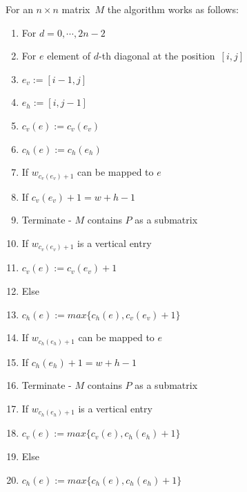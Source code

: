 For an $n\times n$ matrix~$M$ the algorithm works as follows:
\begin{enumerate}
\item For $d=0,\cdots,2n-2$
\item \hspace{5mm} For $e$ element of $d$-th diagonal at the position~$[i,j]$
\item \hspace{1cm} $e_v:=[i-1,j]$
\item \hspace{1cm} $e_h:=[i,j-1]$
\item \hspace{1cm} $c_v(e):=c_v(e_v)$
\item \hspace{1cm} $c_h(e):=c_h(e_h)$
\item \hspace{1cm} If $w_{c_v(e_v)+1}$ can be mapped to $e$
\item \hspace{15mm} If $c_v(e_v)+1=w+h-1$
\item \hspace{2cm} Terminate - $M$ contains $P$ as a submatrix
\item \hspace{15mm} If $w_{c_v(e_v)+1}$ is a vertical entry
\item \hspace{2cm} $c_v(e):=c_v(e_v)+1$
\item \hspace{15mm} Else
\item \hspace{2cm} $c_h(e):=max\{c_h(e),c_v(e_v)+1\}$
\item \hspace{1cm} If $w_{c_h(e_h)+1}$ can be mapped to $e$
\item \hspace{15mm} If $c_h(e_h)+1=w+h-1$
\item \hspace{2cm} Terminate - $M$ contains $P$ as a submatrix
\item \hspace{15mm} If $w_{c_h(e_h)+1}$ is a vertical entry
\item \hspace{2cm} $c_v(e):=max\{c_v(e),c_h(e_h)+1\}$
\item \hspace{15mm} Else
\item \hspace{2cm} $c_h(e):=max\{c_h(e),c_h(e_h)+1\}$
\end{enumerate}

